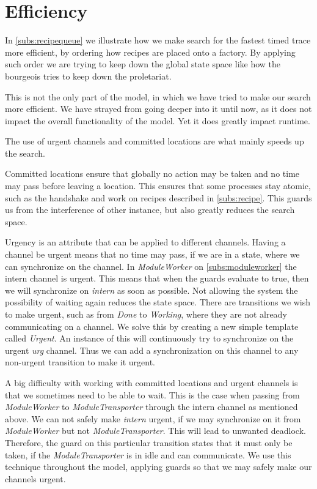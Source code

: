 \section{Efficiency}\label{subs:efficiency}
In \cref{subs:recipequeue} we illustrate how we make search for the fastest timed trace more efficient, by ordering how recipes are placed onto a factory. By applying such order we are trying to keep down the global state space like how the bourgeois tries to keep down the proletariat.   

This is not the only part of the model, in which we have tried to make our search more efficient. We have strayed from going deeper into it until now, as it does not impact the overall functionality of the model. Yet it does greatly impact runtime. 

The use of urgent channels and committed locations are what mainly speeds up the search.

Committed locations ensure that globally no action may be taken and no time may pass before leaving a location. This ensures that some processes stay atomic, such as the handshake and work on recipes described in \cref{subs:recipe}. This guards us from the interference of other instance, but also greatly reduces the search space.

Urgency is an attribute that can be applied to different channels. Having a channel be urgent means that no time may pass, if we are in a state, where we can synchronize on the channel. In \emph{ModuleWorker} on \cref{subs:moduleworker} the intern channel is urgent. This means that when the guards evaluate to true, then we will synchronize on \emph{intern} as soon as possible. Not allowing the system the possibility of waiting again reduces the state space. There are transitions we wish to make urgent, such as from \emph{Done} to \emph{Working}, where they are not already communicating on a channel. We solve this by creating a new simple template called \emph{Urgent}. An instance of this will continuously try to synchronize on the urgent \emph{urg} channel. Thus we can add a synchronization on this channel to any non-urgent transition to make it urgent. 

A big difficulty with working with committed locations and urgent channels is that we sometimes need to be able to wait. This is the case when passing from \emph{ModuleWorker} to \emph{ModuleTransporter} through the intern channel as mentioned above. We can not safely make \emph{intern} urgent, if we may synchronize on it from \emph{ModuleWorker} but not   \emph{ModuleTransporter}. This will lead to unwanted deadlock.  Therefore, the guard on this particular transition states that it must only be taken, if the \emph{ModuleTransporter} is in idle and can communicate. We use this technique throughout the model, applying guards so that we may safely make our channels urgent. 

